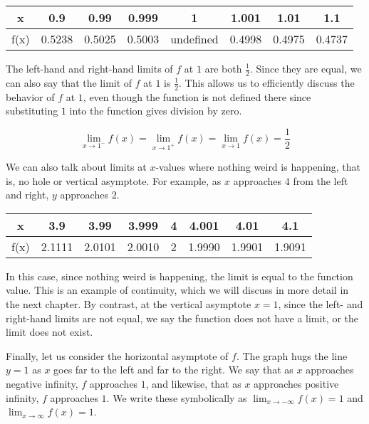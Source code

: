 \begin{center}
\begin{tabular}{ |c|c|c|c|c|c|c|c| } 
 \hline
 x & 0.9 & 0.99 & 0.999 & 1 & 1.001 & 1.01 & 1.1 \\ 
 \hline
 f(x) & 0.5238 & 0.5025 & 0.5003 & undefined & 0.4998 & 0.4975 & 0.4737 \\ 
 \hline
\end{tabular}
\end{center}

The left-hand and right-hand limits of $ f $ at $ 1 $ are both $\frac{1}{2}$. Since they are equal, we can also say that the limit of $ f $ at $ 1 $ is $\frac{1}{2}$. This allows us to efficiently discuss the behavior of $ f $ at $ 1 $, even though the function is not defined there since substituting $ 1 $ into the function gives division by zero.

$$ \lim_{x \rightarrow 1^-} f(x) = \lim_{x \rightarrow 1^+} f(x) = \lim_{x \rightarrow 1} f(x) = \frac{1}{2} $$

We can also talk about limits at $x$-values where nothing weird is happening, that is, no hole or vertical asymptote. For example, as $x$ approaches $4$ from the left and right, $y$ approaches $2$.

\begin{center}
\begin{tabular}{ |c|c|c|c|c|c|c|c| } 
 \hline
 x & 3.9 & 3.99 & 3.999 & 4 & 4.001 & 4.01 & 4.1 \\ 
 \hline
 f(x) & 2.1111 & 2.0101 & 2.0010 & 2 & 1.9990 & 1.9901 & 1.9091 \\ 
 \hline
\end{tabular}
\end{center}

In this case, since nothing weird is happening, the limit is equal to the function value. This is an example of continuity, which we will discuss in more detail in the next chapter. By contrast, at the vertical asymptote $ x = 1 $, since the left- and right-hand limits are not equal, we say the function does not have a limit, or the limit does not exist.

Finally, let us consider the horizontal asymptote of $f$. The graph hugs the line $y = 1$ as $x$ goes far to the left and far to the right. We say that as $x$ approaches negative infinity, $f$ approaches $1$, and likewise, that as $x$ approaches positive infinity, $f$ approaches $1$. We write these symbolically as $\lim_{x \rightarrow -\infty} f(x) = 1$ and $\lim_{x \rightarrow \infty} f(x) = 1$. 

